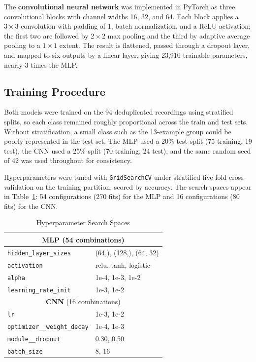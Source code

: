 \documentclass[conference]{IEEEtran}
\begin{document}
The \textbf{convolutional neural network} was implemented in PyTorch \cite{b4} as
three convolutional blocks with channel widths 16, 32, and 64. Each block applies
a $3 \times 3$ convolution with padding of 1, batch normalization, and a ReLU
activation; the first two are followed by $2 \times 2$ max pooling and the third
by adaptive average pooling to a $1 \times 1$ extent. The result is flattened,
passed through a dropout layer, and mapped to six outputs by a linear layer,
giving 23{,}910 trainable parameters, nearly 3 times the MLP.

\subsection{Training Procedure}
Both models were trained on the 94 deduplicated recordings using stratified
splits, so each class remained roughly proportional across the train and test
sets. Without stratification, a small class such as the 13-example group could
be poorly represented in the test set. The MLP used a 20\% test split (75
training, 19 test), the CNN used a 25\% split (70 training, 24 test), and the
same random seed of 42 was used throughout for consistency.

Hyperparameters were tuned with \texttt{GridSearchCV} under stratified five-fold
cross-validation on the training partition, scored by accuracy. The search spaces
appear in Table~\ref{tab:grids}: 54 configurations (270 fits) for the MLP and 16
configurations (80 fits) for the CNN.

\begin{table}[htbp]
\caption{Hyperparameter Search Spaces}
\begin{center}
\begin{tabular}{ll}
\hline
\multicolumn{2}{c}{\textbf{MLP} (54 combinations)} \\
\hline
\texttt{hidden\_layer\_sizes} & (64,), (128,), (64, 32) \\
\texttt{activation} & relu, tanh, logistic \\
\texttt{alpha} & 1e-4, 1e-3, 1e-2 \\
\texttt{learning\_rate\_init} & 1e-3, 1e-2 \\
\hline
\multicolumn{2}{c}{\textbf{CNN} (16 combinations)} \\
\hline
\texttt{lr} & 1e-3, 1e-2 \\
\texttt{optimizer\_\_weight\_decay} & 1e-4, 1e-3 \\
\texttt{module\_\_dropout} & 0.30, 0.50 \\
\texttt{batch\_size} & 8, 16 \\
\hline
\end{tabular}
\label{tab:grids}
\end{center}
\end{table}
\end{document}
